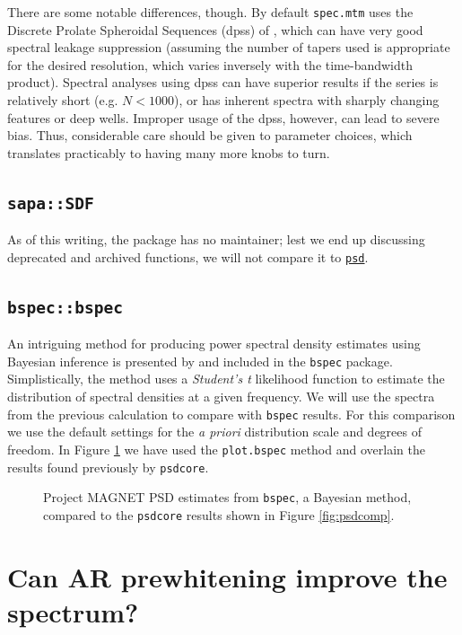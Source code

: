 \documentclass[10pt]{article}\usepackage[]{graphicx}\usepackage[]{color}
\newcommand{\Rcmd}[1]{\texttt{#1}}
\newcommand{\psd}[0]{\href{http://www.github.com/abarbour/psd/}{\color{blue}\Rcmd{psd}}}
\begin{document}
There are some notable differences, though.  
By default \Rcmd{spec.mtm}
 uses the Discrete Prolate Spheroidal Sequences (dpss) 
of \citet{thomson1982},
which can have very good spectral leakage suppression (assuming
the number of tapers used is appropriate for the 
desired resolution, which varies inversely with the time-bandwidth product).
Spectral analyses using dpss can have superior results if the series is
relatively short (e.g. $N < 1000$), or has inherent spectra
with sharply changing features or
deep wells.
Improper usage of the dpss, however, can lead to severe bias.
Thus, considerable care should be given to parameter choices, 
which translates practicably
to having many more knobs to turn.

\subsection{\Rcmd{sapa::SDF}}
As of this writing, the package has no maintainer; 
lest we end up discussing deprecated and archived functions,
we will not compare it to \psd{}.

\subsection{\Rcmd{bspec::bspec}}
An intriguing method for producing power spectral density estimates
 using Bayesian inference
 is presented by \citet{rover2011} and included in
 the \Rcmd{bspec} package.
 Simplistically, the method uses a \emph{Student's t} likelihood function
 to estimate the distribution of spectral densities
 at a given frequency.
 We will use the spectra from the previous 
 calculation to compare with \Rcmd{bspec} results.
 For this comparison
 we use the default 
 settings for the \emph{a priori} distribution scale
 and degrees of freedom.
 In Figure \ref{fig:bayes} we have used the \Rcmd{plot.bspec} method
 and overlain the results found previously by \Rcmd{psdcore}.



\begin{figure}[!htbp]
\begin{center}

\caption{Project MAGNET PSD estimates from \Rcmd{bspec}, a Bayesian method,
 compared to the \Rcmd{psdcore} results shown in Figure \ref{fig:psdcomp}.
}
\label{fig:bayes}
\end{center}
\end{figure}

\section{Can AR prewhitening improve the spectrum?}
\end{document}
